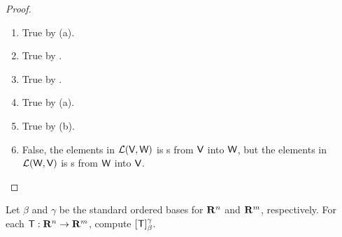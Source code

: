 \begin{proof} \ 
\begin{enumerate}
\item True by (a).
\item True by .
\item True by .
\item True by (a).
\item True by (b).
\item False, the elements in \(\mathcal{L}(\textsf{V}, \textsf{W})\) is \LTRAN{}s from \(\textsf{V}\) into \(\textsf{W}\), but the elements in \(\mathcal{L}(\textsf{W}, \textsf{V})\) is \LTRAN{}s from \(\textsf{W}\) into \(\textsf{V}\).
\end{enumerate}
\end{proof}

\begin{exercise} \label{exercise 2.2.2}
Let \(\beta\) and \(\gamma\) be the standard ordered bases for \(\mathbf{R}^n\) and \(\mathbf{R}^m\), respectively.
For each \LTRAN{} \(\textsf{T}: \mathbf{R}^n \to \mathbf{R}^m\), compute \([\textsf{T}]_{\beta}^{\gamma}\).
\end{exercise}

